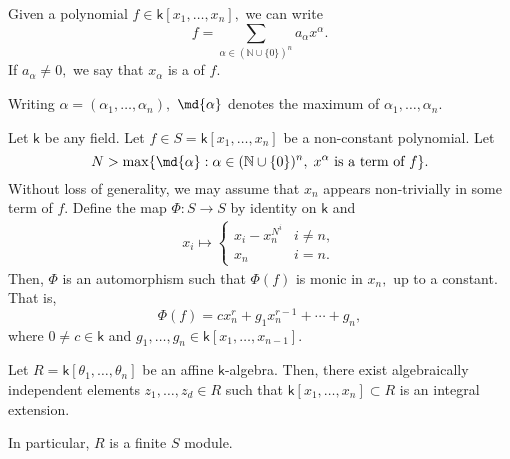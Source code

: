 \documentclass[12pt]{article}	%
\begin{document}
\begin{defn}%
	Given a polynomial $f \in \mathsf{k}[x_1, \ldots, x_n],$ we can write
	\begin{equation*} 
		f = \sum_{\alpha \in (\mathbb{N} \cup \{0\})^n} a_\alpha x^\alpha.
	\end{equation*}
	If $a_\alpha \neq 0,$ we say that $x_\alpha$ is a  of $f.$

	Writing $\alpha = (\alpha_1, \ldots, \alpha_n),$ $\md{\alpha}$ denotes the maximum of $\alpha_1, \ldots, \alpha_n.$
\end{defn}

\begin{prop}
	Let $\mathsf{k}$ be any field. Let $f \in S = \mathsf{k}[x_1, \ldots, x_n]$ be a non-constant polynomial. Let 
	\begin{equation*} 
		N > \max\{\md{\alpha} : \alpha \in (\mathbb{N} \cup \{0\})^n,\;x^{\alpha}\text{ is a term of }f\}.
	\end{equation*}
	Without loss of generality, we may assume that $x_n$ appears non-trivially in some term of $f.$ Define the map $\Phi : S \to S$ by identity on $\mathsf{k}$ and
	\begin{align*} 
		x_i \mapsto \begin{cases}
			x_i - x_n^{N^i} & i \neq n,\\
			x_n & i = n.
		\end{cases}
	\end{align*}
	Then, $\Phi$ is an automorphism such that $\Phi(f)$ is monic in $x_n,$ up to a constant. That is,
	\begin{equation*} 
		\Phi(f) = cx_n^r + g_1x_n^{r - 1} + \cdots + g_{n},
	\end{equation*}
	where $0 \neq c \in \mathsf{k}$ and $g_1, \ldots, g_n \in \mathsf{k}[x_1, \ldots, x_{n - 1}].$
\end{prop}

\begin{thm} \label{thm:NNL}
	Let $R = \mathsf{k}[\theta_1, \ldots, \theta_n]$ be an affine $\mathsf{k}$-algebra. Then, there exist algebraically independent elements $z_1, \ldots, z_d \in R$ such that $\mathsf{k}[x_1, \ldots, x_n] \subset R$ is an integral extension.
	\begin{center}
	\end{center}
	In particular, $R$ is a finite $S$ module.
\end{thm}
\end{document}
